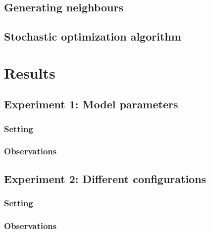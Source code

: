 \documentclass[11pt]{article}
\begin{document}
\subsection{Generating neighbours}

\subsection{Stochastic optimization algorithm}


\section{Results}

\subsection{Experiment 1: Model parameters}

\subsubsection{Setting} 

\subsubsection{Observations}

\subsection{Experiment 2: Different configurations}

\subsubsection{Setting}

\subsubsection{Observations}
\end{document}
